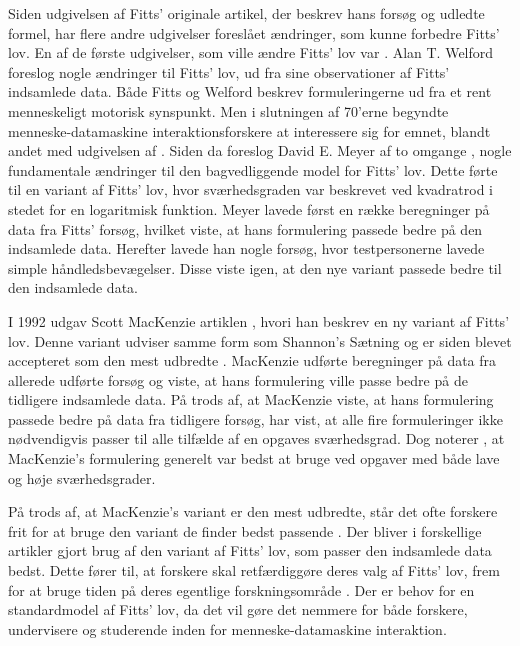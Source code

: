 Siden udgivelsen af Fitts' originale artikel, der beskrev hans forsøg og udledte formel, har flere andre udgivelser foreslået ændringer, som kunne forbedre Fitts' lov. En af de første udgivelser, som ville ændre Fitts' lov var \cite{welford1968}. Alan T. Welford foreslog nogle ændringer til Fitts' lov, ud fra sine observationer af Fitts' indsamlede data. Både Fitts og Welford beskrev formuleringerne ud fra et rent menneskeligt motorisk synspunkt. Men i slutningen af 70'erne begyndte menneske-datamaskine interaktionsforskere at interessere sig for emnet, blandt andet med udgivelsen af \cite{card1978}. Siden da foreslog David E. Meyer af to omgange \cite{meyer1988, meyer1990}, nogle fundamentale ændringer til den bagvedliggende model for Fitts' lov. Dette førte til en variant af Fitts' lov, hvor sværhedsgraden var beskrevet ved kvadratrod i stedet for en logaritmisk funktion. Meyer lavede først en række beregninger på data fra Fitts' forsøg, hvilket viste, at hans formulering passede bedre på den indsamlede data. Herefter lavede han nogle forsøg, hvor testpersonerne lavede simple håndledsbevægelser. Disse viste igen, at den nye variant passede bedre til den indsamlede data.

I 1992 udgav Scott MacKenzie artiklen \cite{mackenzie1992}, hvori han beskrev en ny variant af Fitts' lov. Denne variant udviser samme form som Shannon's Sætning \cite{goldberg2015} og er siden blevet accepteret som den mest udbredte \cite{guiard2011}. MacKenzie udførte beregninger på data fra allerede udførte forsøg og viste, at hans formulering ville passe bedre på de tidligere indsamlede data. På trods af, at MacKenzie viste, at hans formulering passede bedre på data fra tidligere forsøg, har \cite{drewes2010} vist, at alle fire formuleringer ikke nødvendigvis passer til alle tilfælde af en opgaves sværhedsgrad. Dog noterer \cite{goldberg2015}, at MacKenzie's formulering generelt var bedst at bruge ved opgaver med både lave og høje sværhedsgrader.

På trods af, at MacKenzie's variant er den mest udbredte, står det ofte forskere frit for at bruge den variant de finder bedst passende \cite{drewes2010}. Der bliver i forskellige artikler gjort brug af den variant af Fitts' lov, som passer den indsamlede data bedst. Dette fører til, at forskere skal retfærdiggøre deres valg af Fitts' lov, frem for at bruge tiden på deres egentlige forskningsområde \cite{drewes2010}. Der er behov for en standardmodel af Fitts' lov, da det vil gøre det nemmere for både forskere, undervisere og studerende inden for menneske-datamaskine interaktion.\newpage

